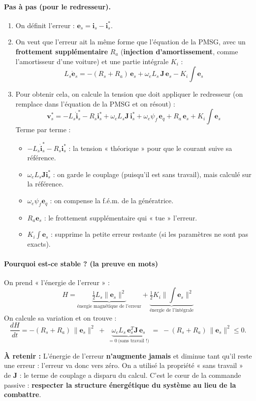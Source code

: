 \documentclass[11pt,a4paper]{article}
\newcommand{\bv}[1]{\boldsymbol{#1}}
\newcommand{\Resume}{\textbf{À retenir : }}
\begin{document}
\paragraph{Pas à pas (pour le redresseur).}
\begin{enumerate}
\item On définit l'erreur : $\bv{e}_s = \bv{i}_s - \bv{i}_s^*$.
\item On veut que l'erreur ait la même forme que l'équation de la PMSG, avec un \textbf{frottement
supplémentaire} $R_a$ (\textbf{injection d'amortissement}, comme l'amortisseur d'une voiture) et une partie
intégrale $K_i$ :
\[
L_s\dot{\bv{e}}_s = -(R_s+R_a)\,\bv{e}_s + \omega_e L_s\,\mathbf{J}\,\bv{e}_s - K_i\!\int\!\bv{e}_s
\]
\item Pour obtenir cela, on calcule la tension que doit appliquer le redresseur (on remplace dans
l'équation de la PMSG et on résout) :
\begin{equation}
\boxed{\bv{v}_s^* = -L_s\dot{\bv{i}}_s^* - R_s\bv{i}_s^* + \omega_e L_s\mathbf{J}\,\bv{i}_s^* + \omega_e\psi_f\,\bv{e}_q + R_a\,\bv{e}_s + K_i\!\int\!\bv{e}_s}
\end{equation}
Terme par terme :
\begin{itemize}
\item $-L_s\dot{\bv{i}}_s^* - R_s\bv{i}_s^*$ : la tension « théorique » pour que le courant suive sa référence.
\item $\omega_e L_s\mathbf{J}\bv{i}_s^*$ : on garde le couplage (puisqu'il est sans travail), mais calculé sur la référence.
\item $\omega_e\psi_f\bv{e}_q$ : on compense la f.é.m. de la génératrice.
\item $R_a\bv{e}_s$ : le frottement supplémentaire qui « tue » l'erreur.
\item $K_i\int\bv{e}_s$ : supprime la petite erreur restante (si les paramètres ne sont pas exacts).
\end{itemize}
\end{enumerate}

\paragraph{Pourquoi est-ce stable ? (la preuve en mots)}
On prend « l'énergie de l'erreur » :
\[
H = \underbrace{\tfrac12 L_s\|\bv{e}_s\|^2}_{\text{énergie magnétique de l'erreur}} + \underbrace{\tfrac12 K_i\|\textstyle\int\bv{e}_s\|^2}_{\text{énergie de l'intégrale}}
\]
On calcule sa variation et on trouve :
\[
\frac{dH}{dt} = -(R_s+R_a)\,\|\bv{e}_s\|^2 \;+\; \underbrace{\omega_e L_s\,\bv{e}_s^T\mathbf{J}\,\bv{e}_s}_{=0\ \text{(sans travail !)}} \;=\; -(R_s+R_a)\,\|\bv{e}_s\|^2 \le 0 .
\]
\begin{resume}
\Resume
L'énergie de l'erreur \textbf{n'augmente jamais} et diminue tant qu'il reste une erreur : l'erreur va donc
vers zéro. On a utilisé la propriété « sans travail » de $\mathbf{J}$ : le terme de couplage a disparu du calcul.
C'est le c\oe ur de la commande passive : \textbf{respecter la structure énergétique du système au lieu de la combattre}.
\end{resume}
\end{document}
